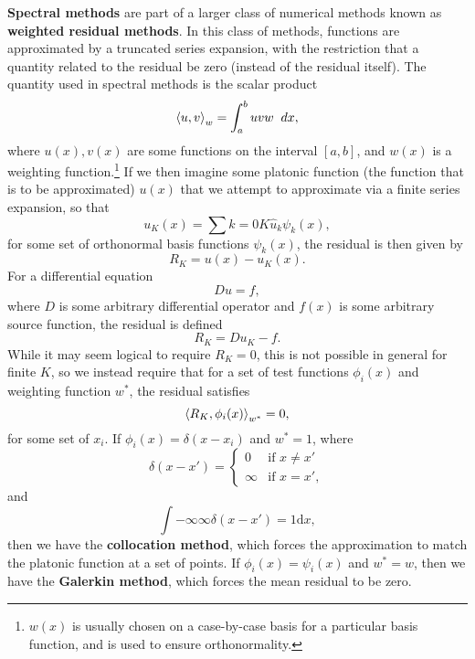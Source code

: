{\bf Spectral methods} are  part of a larger class of numerical methods known as {\bf weighted residual methods}. In this class of methods, functions are approximated by a truncated series expansion, with the restriction that a quantity related to the residual be zero (instead of the residual itself). The quantity used in spectral methods is the scalar product 
\begin{equation}\label{eq:scalarProduct}
\scprod{u}{v}{w} = \int{a}{b}{uvw}{dx},
\end{equation}
where  $u(x),v(x)$ are some functions on the interval $[a,b]$, and $w(x)$ is a weighting function.\footnote{$w(x)$ is usually chosen on a case-by-case basis for a particular basis function, and is used to ensure orthonormality.} If we then imagine some platonic function (the function that is to be approximated) $u(x)$ that we attempt to approximate via a finite series expansion, so that
\begin{equation}\label{eq:seriesExpansion}
u_K(x) = \sum{k=0}{K}{\hat{u}_k \psi_k(x)},
\end{equation}
for some set of orthonormal basis functions $\psi_k(x)$, the residual is then given by
\begin{equation}
R_K = u(x)-u_K(x).
\end{equation} 
For a differential equation
\begin{equation}
Du = f,
\end{equation}
where $D$ is some arbitrary differential operator and $f(x)$ is some arbitrary source function, the residual is defined
\begin{equation}
R_K = Du_K - f.
\end{equation}
While it may seem logical to require $R_K = 0$, this is not possible in general for finite $K$, so we instead require that for a set of test functions $\phi_i(x)$ and weighting function $w^*$, the residual satisfies
\begin{equation}\label{eq:SpectralZero}
\left < R_K,\phi_i(x) \right >_{w^*} = 0,
\end{equation}
for some set of $x_i$. If $\phi_i(x) = \delta(x-x_i)$ and $w^* = 1$, where
\begin{equation}
\delta(x-x') = 
\begin{cases}
0 &\text{if } x \neq x'\\
\infty &\text{if } x = x',
\end{cases}
\end{equation}
and
\begin{equation}
 \int{-\infty}{\infty}{\delta(x-x') = 1}{\textrm{d}x},
\end{equation}
 then we have the {\bf collocation method}, which forces the approximation to match the platonic function at a set of points. If $\phi_i(x) = \psi_i(x)$ and $w^* = w$, then we have the {\bf Galerkin method}, which forces the mean residual to be zero. 

